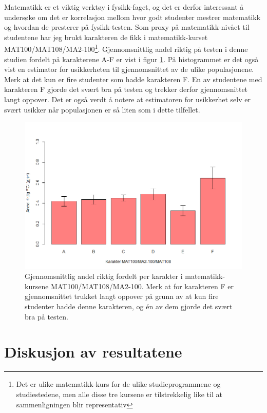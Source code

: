 \documentclass[a4paper,norsk,12pt]{article}
\begin{document}
Matematikk er et viktig verktøy i fysikk-faget, og det er derfor interessant å undersøke om det er korrelasjon mellom hvor godt studenter mestrer matematikk og hvordan de presterer på fysikk-testen. Som proxy på matematikk-nivået til studentene har jeg brukt karakteren de fikk i matematikk-kurset MAT100/MAT108/MA2-100\footnote{Det er ulike matematikk-kurs for de ulike studieprogrammene og studiestedene, men alle disse tre kursene er tilstrekkelig like til at sammenligningen blir representativ}. Gjennomsnittlig andel riktig på testen i denne studien fordelt på karakterene A-F er vist i figur \ref{fig:mat100}. På histogrammet er det også vist en estimator for usikkerheten til gjennomsnittet av de ulike populasjonene. Merk at det kun er fire studenter som hadde karakteren F. En av studentene med karakteren F gjorde det svært bra på testen og trekker derfor gjennomsnittet langt oppover. Det er også verdt å notere at estimatoren for usikkerhet selv er svært usikker når populasjonen er så liten som i dette tilfellet.
\begin{figure}[tp]
\begin{center}
	\includegraphics[width=.48\textwidth]{./mat100}
\end{center}
	\caption{Gjennomsnittlig andel riktig fordelt per karakter i matematikk-kursene MAT100/MAT108/MA2-100. Merk at for karakteren F er gjennomsnittet trukket langt oppover på grunn av at kun fire studenter hadde denne karakteren, og \'en av dem gjorde det svært bra på testen.}
	\label{fig:mat100}
\end{figure}



\section{Diskusjon av resultatene}
\end{document}
